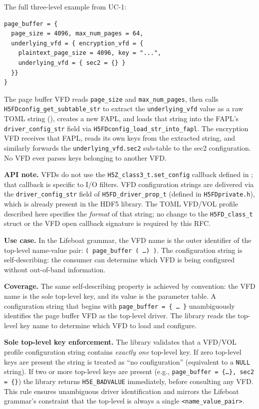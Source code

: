 \documentclass[../RFC-HDFG-2026-001.tex]{subfiles}
\begin{document}
The full three-level example from UC-1:

\begin{verbatim}
page_buffer = {
  page_size = 4096, max_num_pages = 64,
  underlying_vfd = { encryption_vfd = {
    plaintext_page_size = 4096, key = "...",
    underlying_vfd = { sec2 = {} }
  }}
}
\end{verbatim}

The page buffer VFD reads \texttt{page\_size} and \texttt{max\_num\_pages},
then calls \texttt{H5FDconfig\_get\_subtable\_str} to extract the
\texttt{underlying\_vfd} value as a raw TOML string
(), creates a new FAPL, and loads that
string into the FAPL's \texttt{driver\_config\_str} field via
\texttt{H5FDconfig\_load\_str\_into\_fapl}.  The encryption VFD
receives that FAPL, reads its own keys from the extracted string, and
similarly forwards the \texttt{underlying\_vfd.sec2} sub-table to the sec2
configuration.  No VFD ever parses keys belonging to another VFD.

\textbf{API note.}  VFDs do not use the \texttt{H5Z\_class3\_t.set\_config}
callback defined in ; that callback is specific to I/O
filters.  VFD configuration strings are delivered via the
\texttt{driver\_config\_str} field of \texttt{H5FD\_driver\_prop\_t} (defined
in \texttt{H5FDprivate.h}), which is already present in the HDF5 library.
The TOML VFD/VOL profile described here specifies the \emph{format} of that
string; no change to the \texttt{H5FD\_class\_t} struct or the VFD open
callback signature is required by this RFC.


\textbf{Use case.}  In the Lifeboat grammar, the VFD name is the outer
identifier of the top-level name-value pair: \texttt{( page\_buffer ( \ldots )
)}.  The configuration string is self-describing: the consumer can determine
which VFD is being configured without out-of-band information.

\textbf{Coverage.}  The same self-describing property is achieved
by convention: the VFD name is the sole top-level key, and its value is the
parameter table.  A configuration string that begins with
\texttt{page\_buffer~=~\{~\ldots~\}} unambiguously identifies the page buffer
VFD as the top-level driver.  The library reads the top-level key name to
determine which VFD to load and configure.

\textbf{Sole top-level key enforcement.}  The library validates that a
VFD/VOL profile configuration string contains \emph{exactly one} top-level
key.  If zero top-level keys are present the string is treated as ``no
configuration'' (equivalent to a \texttt{NULL} string).  If two or more
top-level keys are present (e.g., \texttt{page\_buffer = \{\ldots\}, sec2 =
\{\}}) the library returns \texttt{H5E\_BADVALUE} immediately, before
consulting any VFD.  This rule ensures unambiguous driver identification and
mirrors the Lifeboat grammar's constraint that the top-level is always a
single \texttt{<name\_value\_pair>}.
\end{document}
